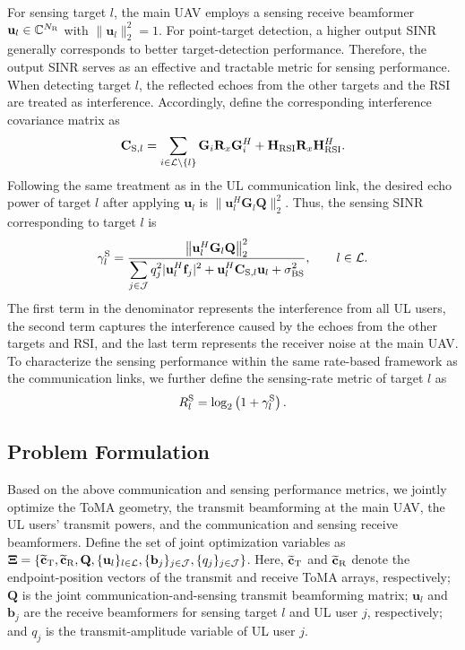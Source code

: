 \documentclass[letterpaper,journal]{IEEEtran}
\begin{document}
For sensing target $l$, the main UAV employs a sensing receive beamformer $\mathbf u_l\in\mathbb C^{N_{\rm R}}$ with $\|\mathbf u_l\|_2^2=1$. For point-target detection, a higher output SINR generally corresponds to better target-detection performance. Therefore, the output SINR serves as an effective and tractable metric for sensing performance. When detecting target $l$, the reflected echoes from the other targets and the RSI are treated as interference. Accordingly, define the corresponding interference covariance matrix as
\begin{equation}
\mathbf C_{{\rm S},l}
=
\sum_{i\in\mathcal L\setminus\{l\}}
\mathbf G_i
\mathbf R_x
\mathbf G_i^H
+
\mathbf H_{\rm RSI}
\mathbf R_x
\mathbf H_{\rm RSI}^H.
\label{eq:sensing_interference_cov}
\end{equation}
Following the same treatment as in the UL communication link, the desired echo power of target $l$ after applying $\mathbf u_l$ is $\|\mathbf u_l^H\mathbf G_l\mathbf Q\|_2^2$. Thus, the sensing SINR corresponding to target $l$ is
\begin{equation}
\gamma_l^{\rm S}
=
\frac{
\left\|
\mathbf u_l^H
\mathbf G_l
\mathbf Q
\right\|_2^2
}{
\displaystyle
\sum_{j\in\mathcal J}
q_j^2
|\mathbf u_l^H\mathbf f_j|^2
+
\mathbf u_l^H
\mathbf C_{{\rm S},l}
\mathbf u_l
+
\sigma_{\rm BS}^2
},
\qquad
l\in\mathcal L.
\label{eq:sensing_sinr}
\end{equation}
The first term in the denominator represents the interference from all UL users, the second term captures the interference caused by the echoes from the other targets and RSI, and the last term represents the receiver noise at the main UAV. To characterize the sensing performance within the same rate-based framework as the communication links, we further define the sensing-rate metric of target $l$ as
\begin{equation}
R_l^{\rm S}
=
\log_2
\left(
1+\gamma_l^{\rm S}
\right).
\label{eq:sensing_rate}
\end{equation}

\subsection{Problem Formulation}
\label{subsec:problem_formulation}

Based on the above communication and sensing performance metrics, we jointly optimize the ToMA geometry, the transmit beamforming at the main UAV, the UL users' transmit powers, and the communication and sensing receive beamformers. Define the set of joint optimization variables as $\boldsymbol{\Xi}=\{\widetilde{\mathbf c}_{\rm T},\widetilde{\mathbf c}_{\rm R},\mathbf Q,\{\mathbf u_l\}_{l\in\mathcal L},\{\mathbf b_j\}_{j\in\mathcal J},\{q_j\}_{j\in\mathcal J}\}$. Here, $\widetilde{\mathbf c}_{\rm T}$ and $\widetilde{\mathbf c}_{\rm R}$ denote the endpoint-position vectors of the transmit and receive ToMA arrays, respectively; $\mathbf Q$ is the joint communication-and-sensing transmit beamforming matrix; $\mathbf u_l$ and $\mathbf b_j$ are the receive beamformers for sensing target $l$ and UL user $j$, respectively; and $q_j$ is the transmit-amplitude variable of UL user $j$.
\end{document}
